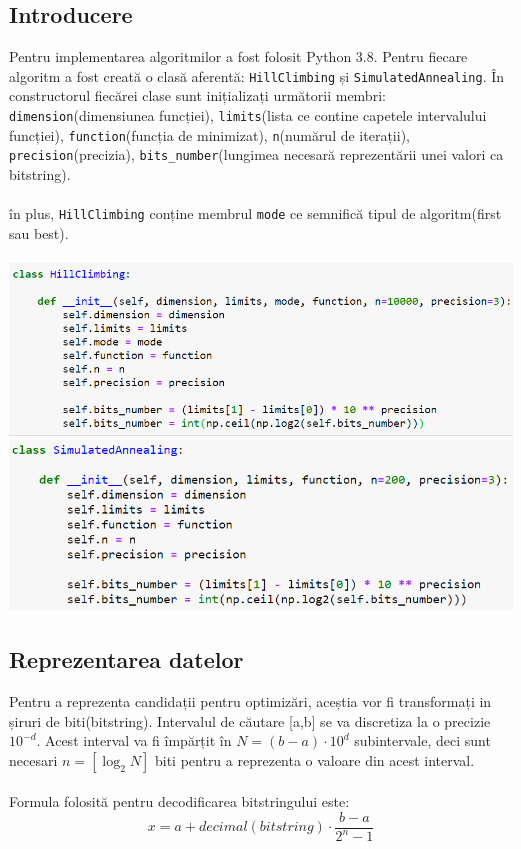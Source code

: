 \documentclass{article}
\begin{document}
\subsection{Introducere}
Pentru implementarea algoritmilor a fost folosit Python 3.8. Pentru fiecare algoritm a fost creată o clasă aferentă: \texttt{HillClimbing} și \texttt{SimulatedAnnealing}. În constructorul fiecărei clase sunt inițializați următorii membri: \texttt{dimension}(dimensiunea funcției), \texttt{limits}(lista ce contine capetele intervalului funcției), \texttt{function}(funcția de minimizat), \texttt{n}(numărul de iterații), \texttt{precision}(precizia), \texttt{bits\_number}(lungimea necesară reprezentării unei valori ca bitstring).\\\\
în plus, \texttt{HillClimbing} conține membrul \texttt{mode} ce semnifică tipul de algoritm(first sau best).\\\\
\includegraphics[width=.9\textwidth]{3a}\\
\includegraphics[width=.9\textwidth]{3b}
\subsection{Reprezentarea datelor}
Pentru a reprezenta candidații pentru optimizări, aceștia vor fi transformați in șiruri de biti(bitstring). Intervalul de căutare [a,b] se va discretiza la o precizie $10^{-d}$. Acest interval va fi împărțit în $ N = (b - a) \cdot 10^d$ subintervale, deci sunt necesari $n = [\log_2N]$ biti pentru a reprezenta o valoare din acest interval.\\\\ Formula folosită pentru decodificarea bitstringului este:
$$x = a + decimal(bitstring)\cdot\frac{b-a}{2^n - 1}$$\\\\
\end{document}
